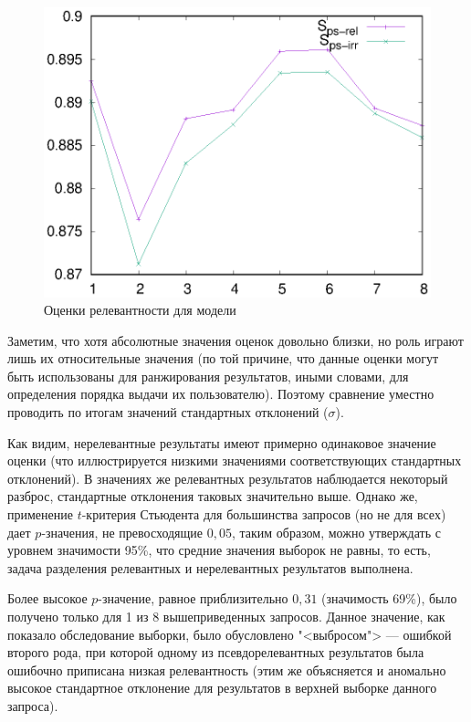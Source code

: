 \begin{figure}
    \centerline{\includegraphics[scale=0.8]{314-1_scores.eps}}
    \caption{Оценки релевантности для модели}\label{fig:ep-scores}
\end{figure}

Заметим, что хотя абсолютные значения оценок довольно близки, но роль играют лишь их относительные значения (по той причине, что
данные оценки могут быть использованы для ранжирования результатов, иными словами, для определения порядка выдачи их пользователю).
Поэтому сравнение уместно проводить по итогам значений стандартных отклонений ($\sigma$).

Как видим, нерелевантные результаты имеют примерно одинаковое значение оценки (что иллюстрируется низкими значениями соответствующих 
стандартных отклонений). В значениях же релевантных результатов наблюдается некоторый разброс, стандартные отклонения таковых 
значительно выше. Однако же, применение $t$-критерия Стьюдента \cite{10.2307/2331554} для большинства запросов (но не для всех)
дает $p$-значения, не превосходящие $0{,}05$, таким образом, можно утверждать с уровнем значимости 95\%, что средние значения
выборок не равны, то есть, задача разделения релевантных и нерелевантных результатов выполнена.

Более высокое $p$-значение, равное приблизительно $0{,}31$ (значимость 69\%), было получено только для 1 из 8 вышеприведенных запросов.
Данное значение, как показало обследование выборки, было обусловлено "<выбросом"> --- ошибкой второго рода, при которой одному из
псевдорелевантных результатов была ошибочно приписана низкая релевантность (этим же объясняется и аномально высокое стандартное
отклонение для результатов в верхней выборке данного запроса).